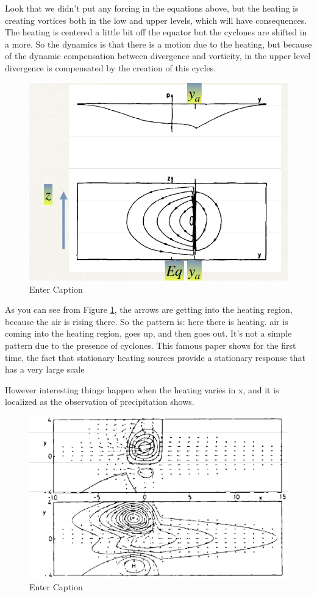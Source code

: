 Look that we didn't put any forcing in the equations above, but the heating is creating vortices both in the low and upper levels, which will have consequences. The heating is centered a little bit off the equator but the cyclones are shifted in a more. So the dynamics is that there is a motion due to the heating, but because of the dynamic compensation between divergence and vorticity, in the upper level divergence is compensated by the creation of this cycles.

\begin{figure}[h!]
	\centering
	\includegraphics[width=0.5\linewidth]{uploads/23image.png}
	\caption{Enter Caption}
	\label{fig: fig 2}
\end{figure}


As you can see from Figure \ref{fig: fig 2}, the arrows are getting into the heating region, because the air is rising there.
So the pattern is: here there is heating. air is coming into the heating region, goes up, and then goes out. It's not a simple pattern due to the presence of cyclones.
This famous paper shows for the first time, the fact that stationary heating sources provide a stationary response that has a very large scale

However interesting things happen when the heating varies in x, and it is localized as the observation of precipitation shows.
\begin{figure}[h!]
	\centering
	\includegraphics[width=0.5\linewidth]{uploads/25image.png}
	\caption{Enter Caption}
	\label{fig:enter-label}
\end{figure}
\\

